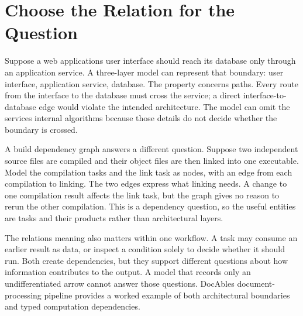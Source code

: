 \section{Choose the Relation for the Question}\label{heading:choose-the-relation-for-the-question}

Suppose a web application\textquotesingle s user interface should reach its database only through an application service. A three-layer model can represent that boundary: user interface, application service, database. The property concerns paths. Every route from the interface to the database must cross the service; a direct interface-to-database edge would violate the intended architecture. The model can omit the service\textquotesingle s internal algorithms because those details do not decide whether the boundary is crossed.

A build dependency graph answers a different question. Suppose two independent source files are compiled and their object files are then linked into one executable. Model the compilation tasks and the link task as nodes, with an edge from each compilation to linking. The two edges express what linking needs. A change to one compilation result affects the link task, but the graph gives no reason to rerun the other compilation. This is a dependency question, so the useful entities are tasks and their products rather than architectural layers.

The relation\textquotesingle s meaning also matters within one workflow. A task may consume an earlier result as data, or inspect a condition solely to decide whether it should run. Both create dependencies, but they support different questions about how information contributes to the output. A model that records only an undifferentiated arrow cannot answer those questions. DocAble\textquotesingle s document-processing pipeline provides a worked example of both architectural boundaries and typed computation dependencies.





